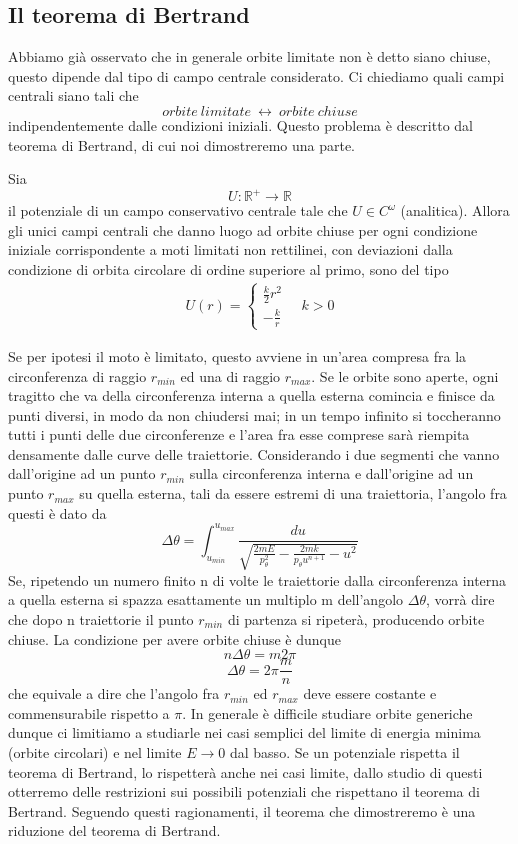 \documentclass[
10pt, %
a4paper, %
oneside, %
headinclude,footinclude, %
BCOR5mm, %
]{scrartcl}
\begin{document}
\subsection{Il teorema di Bertrand}
Abbiamo già osservato che in generale orbite limitate non è detto siano chiuse, questo dipende dal tipo di campo centrale considerato. Ci chiediamo quali campi centrali siano tali che 
\[orbite\ limitate\ \leftrightarrow\ orbite\ chiuse\]
indipendentemente dalle condizioni iniziali. Questo problema è descritto dal teorema di Bertrand, di cui noi dimostreremo una parte. 
\begin{teorema}
	Sia 
	\[U:\mathbb{R}^+\rightarrow\mathbb{R}\]
	il potenziale di un campo conservativo centrale tale che \(U\in C^{\omega}\) (analitica). Allora gli unici campi centrali che danno luogo ad orbite chiuse per ogni condizione iniziale corrispondente a moti limitati non rettilinei, con deviazioni dalla condizione di orbita circolare di ordine superiore al primo, sono del tipo
	\begin{align*}
		U(r) = \begin{cases}
			\frac{k}{2}r^2\\
			-\frac{k}{r}
		\end{cases}
		\quad k>0
	\end{align*}  
\end{teorema}
Se per ipotesi il moto è limitato, questo avviene in un'area compresa fra la circonferenza di raggio \(r_{min}\) ed una di raggio \(r_{max}\). Se le orbite sono aperte, ogni tragitto che va della circonferenza interna a quella esterna comincia e finisce da punti diversi, in modo da non chiudersi mai; in un tempo infinito si toccheranno tutti i punti delle due circonferenze e l'area fra esse comprese sarà riempita densamente dalle curve delle traiettorie. Considerando i due segmenti che vanno dall'origine ad un punto \(r_{min}\) sulla circonferenza interna e dall'origine ad un punto \(r_{max}\) su quella esterna, tali da essere estremi di una traiettoria, l'angolo fra questi è dato da
\[\Delta\theta = \int_{u_{min}}^{u_{max}}\frac{du}{\sqrt{\frac{2mE}{p_{\theta}^2}-\frac{2mk}{p_{\theta}u^{n+1}}-u^2}}\]
Se, ripetendo un numero finito n di volte le traiettorie dalla circonferenza interna a quella esterna si spazza esattamente un multiplo m dell'angolo $\Delta\theta$, vorrà dire che dopo n traiettorie il punto \(r_{min}\) di partenza si ripeterà, producendo orbite chiuse. La condizione per avere orbite chiuse è dunque
\[n\Delta\theta = m 2\pi \]
\[\Delta\theta= 2\pi \frac{m}{n}\]
che equivale a dire che l'angolo fra \(r_{min}\) ed \(r_{max}\) deve essere costante e commensurabile rispetto a $\pi$. In generale è difficile studiare orbite generiche dunque ci limitiamo a studiarle nei casi semplici del limite di energia minima (orbite circolari) e nel limite \(E\rightarrow 0\) dal basso. Se un potenziale rispetta il teorema di Bertrand, lo rispetterà anche nei casi limite, dallo studio di questi otterremo delle restrizioni sui possibili potenziali che rispettano il teorema di Bertrand. Seguendo questi ragionamenti, il teorema che dimostreremo è una riduzione del teorema di Bertrand.
\end{document}
